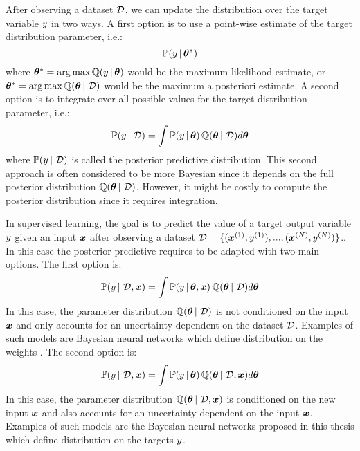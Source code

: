 After observing a dataset $\operatorname{\mathcal{D}}$, we can update the distribution over the target variable $y$ in two ways.
A first option is to use a point-wise estimate of the target distribution parameter, i.e.:
\begin{equation}
    \mathbb{P}(y \,|\, \bm{\theta}^*)
\end{equation}
where $\bm{\theta}^*=\operatorname*{arg\,max}\operatorname{\mathbb{Q}}(y \,|\, \bm{\theta})$ would be the maximum likelihood estimate, or $\bm{\theta}^*=\operatorname*{arg\,max}\operatorname{\mathbb{Q}}(\bm{\theta} \,|\, \operatorname{\mathcal{D}})$ would be the maximum a posteriori estimate.
A second option is to integrate over all possible values for the target distribution parameter, i.e.:
\begin{equation}
    \label{eq:posterior_predictive}
    \mathbb{P}(y \,|\, \operatorname{\mathcal{D}}) = \int \mathbb{P}(y \,|\, \bm{\theta}) \operatorname{\mathbb{Q}}(\bm{\theta} \,|\, \operatorname{\mathcal{D}}) d\bm{\theta}
\end{equation}
where $\mathbb{P}(y \,|\, \operatorname{\mathcal{D}})$ is called the posterior predictive distribution. 
This second approach is often considered to be more Bayesian since it depends on the full posterior distribution $\operatorname{\mathbb{Q}}(\bm{\theta} \,|\, \operatorname{\mathcal{D}})$.
However, it might be costly to compute the posterior distribution since it requires integration.

In supervised learning, the goal is to predict the value of a target output variable $y$ given an input $\bm{x}$ after observing a dataset $\operatorname{\mathcal{D}}=\{(\bm{x}^{(1)}, y^{(1)}), ..., (\bm{x}^{(N)}, y^{(N)})\}$..
In this case the posterior predictive requires to be adapted with two main options. The first option is:
\begin{equation}
    \mathbb{P}(y \,|\, \operatorname{\mathcal{D}}, \bm{x}) = \int \mathbb{P}(y \,|\, \bm{\theta}, \bm{x}) \operatorname{\mathbb{Q}}(\bm{\theta} \,|\, \operatorname{\mathcal{D}}) d\bm{\theta}
\end{equation}
In this case, the parameter distribution $\operatorname{\mathbb{Q}}(\bm{\theta} \,|\, \operatorname{\mathcal{D}})$ is not conditioned on the input $\bm{x}$ and only accounts for an uncertainty dependent on the dataset $\operatorname{\mathcal{D}}$. Examples of such models are Bayesian neural networks which define distribution on the weights \cite{bayesian-networks}.
The second option is:
\begin{equation}
    \mathbb{P}(y \,|\, \operatorname{\mathcal{D}}, \bm{x}) = \int \mathbb{P}(y \,|\, \bm{\theta}) \operatorname{\mathbb{Q}}(\bm{\theta} \,|\, \operatorname{\mathcal{D}}, \bm{x}) d\bm{\theta}
\end{equation}
In this case, the parameter distribution $\operatorname{\mathbb{Q}}(\bm{\theta} \,|\, \operatorname{\mathcal{D}}, \bm{x})$ is conditioned on the new input $\bm{x}$ and also accounts for an uncertainty dependent on the input $\bm{x}$. Examples of such models are the Bayesian neural networks proposed in this thesis \cite{charpentier2020,natpn, graph-postnet,charpentier2022uncertainty-rl,uceloss} which define distribution on the targets $y$.

